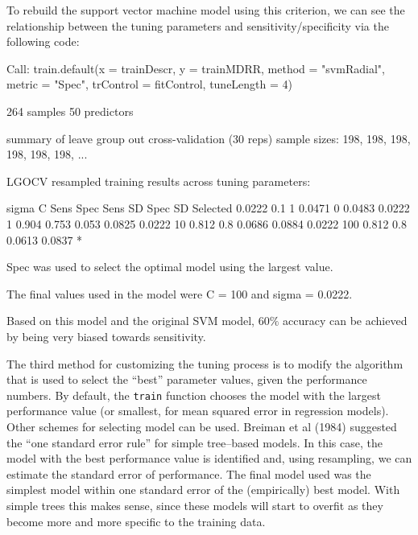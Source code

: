\documentclass[12pt]{article}
\begin{document}
To rebuild the support vector machine model using this criterion, we can see the relationship between the tuning parameters and sensitivity/specificity via the following code:
\begin{Schunk}
\begin{Soutput}
Call:
train.default(x = trainDescr, y = trainMDRR, method = "svmRadial", 
    metric = "Spec", trControl = fitControl, tuneLength = 4)

264 samples
50 predictors

summary of leave group out cross-validation (30 reps) sample sizes:
    198, 198, 198, 198, 198, 198, ... 

LGOCV resampled training results across tuning parameters:

  sigma   C    Sens   Spec    Sens SD  Spec SD  Selected
  0.0222  0.1  1      0.0471  0        0.0483           
  0.0222  1    0.904  0.753   0.053    0.0825           
  0.0222  10   0.812  0.8     0.0686   0.0884           
  0.0222  100  0.812  0.8     0.0613   0.0837   *       

Spec was used to select the optimal model using the largest value.

The final values used in the model were C = 100 and sigma = 0.0222.
\end{Soutput}
\end{Schunk}
Based on this model and the original SVM model, 60$\%$ accuracy can be achieved  by being very biased towards sensitivity.

The third method for customizing the tuning process is to modify the algorithm that is used to select the ``best'' parameter values, given the performance numbers. By default, the \texttt{train} function chooses the model with the largest performance value (or smallest, for mean squared error in regression models). Other schemes for selecting model can be used.  Breiman et al (1984) suggested the ``one standard error rule'' for simple tree--based models. In this case, the model with the best performance value is identified and, using resampling, we can estimate the standard error of performance. The final model used was the simplest model within one standard error of the (empirically) best model. With simple trees this makes sense, since these models will start to overfit as they become more and more specific to the training data.
\end{document}
